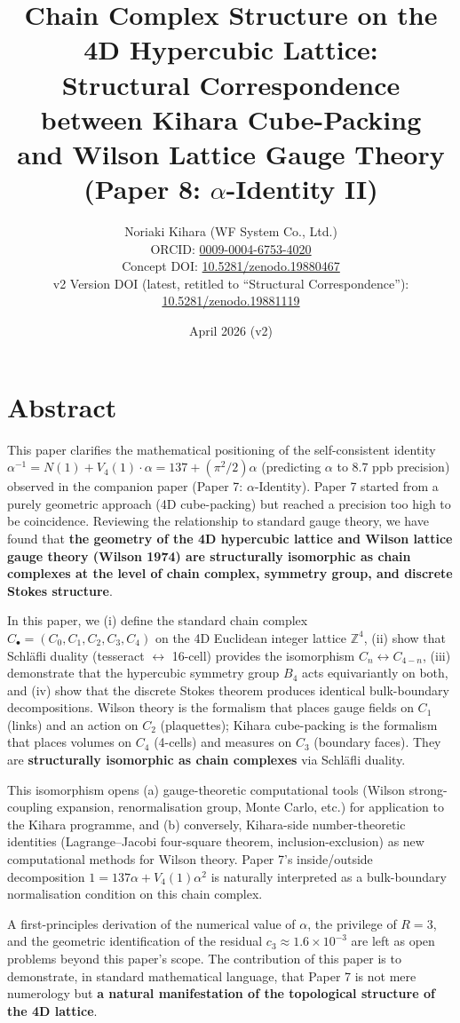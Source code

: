 \documentclass[a4paper,11pt]{article}
\title{Chain Complex Structure on the 4D Hypercubic Lattice: \\ Structural Correspondence between Kihara Cube-Packing \\ and Wilson Lattice Gauge Theory \\ \large (Paper 8: $\alpha$-Identity II)}
\author{Noriaki Kihara (WF System Co., Ltd.) \\ ORCID: \href{https://orcid.org/0009-0004-6753-4020}{0009-0004-6753-4020} \\ Concept DOI: \href{https://doi.org/10.5281/zenodo.19880467}{10.5281/zenodo.19880467} \\ v2 Version DOI (latest, retitled to ``Structural Correspondence''): \href{https://doi.org/10.5281/zenodo.19881119}{10.5281/zenodo.19881119}}
\date{April 2026 (v2)}
\begin{document}
\maketitle

\section*{Abstract}

This paper clarifies the mathematical positioning of the self-consistent identity $\alpha^{-1} = N(1) + V_4(1)\cdot\alpha = 137 + (\pi^2/2)\alpha$ (predicting $\alpha$ to 8.7 ppb precision) observed in the companion paper (Paper 7: $\alpha$-Identity). Paper 7 started from a purely geometric approach (4D cube-packing) but reached a precision too high to be coincidence. Reviewing the relationship to standard gauge theory, we have found that \textbf{the geometry of the 4D hypercubic lattice and Wilson lattice gauge theory (Wilson 1974) are structurally isomorphic as chain complexes at the level of chain complex, symmetry group, and discrete Stokes structure}.

In this paper, we (i) define the standard chain complex $C_\bullet = (C_0, C_1, C_2, C_3, C_4)$ on the 4D Euclidean integer lattice $\mathbb{Z}^4$, (ii) show that Schl\"afli duality (tesseract $\leftrightarrow$ 16-cell) provides the isomorphism $C_n \leftrightarrow C_{4-n}$, (iii) demonstrate that the hypercubic symmetry group $B_4$ acts equivariantly on both, and (iv) show that the discrete Stokes theorem produces identical bulk-boundary decompositions. Wilson theory is the formalism that places gauge fields on $C_1$ (links) and an action on $C_2$ (plaquettes); Kihara cube-packing is the formalism that places volumes on $C_4$ (4-cells) and measures on $C_3$ (boundary faces). They are \textbf{structurally isomorphic as chain complexes} via Schl\"afli duality.

This isomorphism opens (a) gauge-theoretic computational tools (Wilson strong-coupling expansion, renormalisation group, Monte Carlo, etc.) for application to the Kihara programme, and (b) conversely, Kihara-side number-theoretic identities (Lagrange--Jacobi four-square theorem, inclusion-exclusion) as new computational methods for Wilson theory. Paper 7's inside/outside decomposition $1 = 137\alpha + V_4(1)\alpha^2$ is naturally interpreted as a bulk-boundary normalisation condition on this chain complex.

A first-principles derivation of the numerical value of $\alpha$, the privilege of $R = 3$, and the geometric identification of the residual $c_3 \approx 1.6 \times 10^{-3}$ are left as open problems beyond this paper's scope. The contribution of this paper is to demonstrate, in standard mathematical language, that Paper 7 is not mere numerology but \textbf{a natural manifestation of the topological structure of the 4D lattice}.
\end{document}
